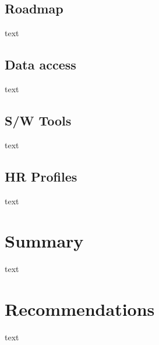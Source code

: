 \documentclass[10pt]{article} %
\begin{document}
\subsection{Roadmap}

text

\subsection{Data access}

text

\subsection{S/W Tools}

text

\subsection{HR Profiles}

text


\section{Summary}

text

\section{Recommendations}

text
\end{document}
